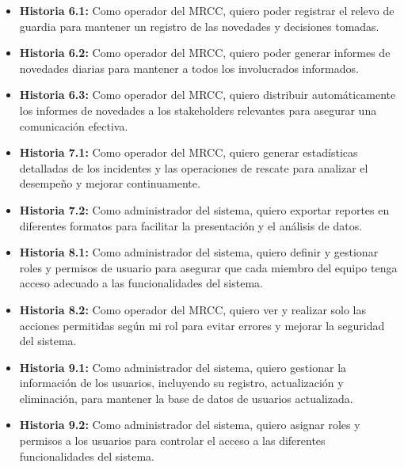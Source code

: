 
\begin{itemize}
    \item \textbf{Historia 6.1:} Como operador del MRCC, quiero poder registrar el relevo de guardia para mantener un registro de las 
    novedades y decisiones tomadas.
    \item \textbf{Historia 6.2:} Como operador del MRCC, quiero poder generar informes de novedades diarias para mantener a todos los 
    involucrados informados.
    \item \textbf{Historia 6.3:} Como operador del MRCC, quiero distribuir automáticamente los informes de novedades a los stakeholders 
    relevantes para asegurar una comunicación efectiva.
\end{itemize}


\begin{itemize}
    \item \textbf{Historia 7.1:} Como operador del MRCC, quiero generar estadísticas detalladas de los incidentes y las operaciones
    de rescate para analizar el desempeño y mejorar continuamente.
    \item \textbf{Historia 7.2:} Como administrador del sistema, quiero exportar reportes en diferentes formatos para facilitar la 
    presentación y el análisis de datos.
\end{itemize}


\begin{itemize}
    \item \textbf{Historia 8.1:} Como administrador del sistema, quiero definir y gestionar roles y permisos de usuario para asegurar 
    que cada miembro del equipo tenga acceso adecuado a las funcionalidades del sistema.
    \item \textbf{Historia 8.2:} Como operador del MRCC, quiero ver y realizar solo las acciones permitidas según mi rol para evitar 
    errores y mejorar la seguridad del sistema.
\end{itemize}


\begin{itemize}
    \item \textbf{Historia 9.1:} Como administrador del sistema, quiero gestionar la información de los usuarios, incluyendo su registro, 
    actualización y eliminación, para mantener la base de datos de usuarios actualizada.
    \item \textbf{Historia 9.2:} Como administrador del sistema, quiero asignar roles y permisos a los usuarios para controlar el acceso 
    a las diferentes funcionalidades del sistema.
\end{itemize}
